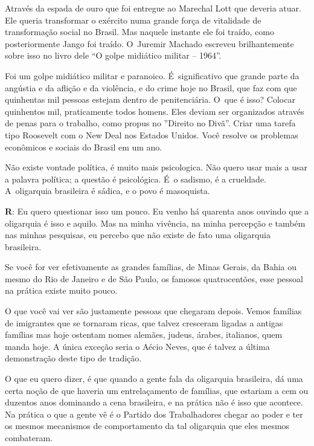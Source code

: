  

Através da espada de ouro que foi entregue ao Marechal Lott que deveria
atuar. Ele queria transformar o exército numa grande força de vitalidade
de transformação social no Brasil. Mas naquele instante ele foi traído,
como posteriormente Jango foi traído. O~Juremir Machado escreveu
brilhantemente sobre isso no livro dele ``O golpe midiático militar --
1964''.

 

Foi um golpe midiático militar e paranoico. É~significativo que grande
parte da angústia e da aflição e da violência, e do crime hoje no
Brasil, que faz com que quinhentas mil pessoas estejam dentro de
penitenciária. O~que é isso? Colocar quinhentos mil, praticamente todos
homens. Eles deviam ser organizados através de penas para o trabalho,
como propus no ''Direito no Divã''. Criar uma tarefa tipo Roosevelt com
o New Deal nos Estados Unidos. Você resolve os problemas econômicos e
sociais do Brasil em um ano.

 

Não existe vontade política, é muito mais psicologica. Não quero usar
mais a usar a palavra política; a questão é psicológica. É~o sadismo, é
a crueldade. A~oligarquia brasileira é sádica, e o povo é masoquista.

 

\textbf{R}: Eu quero questionar isso um pouco. Eu venho há quarenta anos
ouvindo que a oligarquia é isso e aquilo. Mas na minha vivência, na
minha percepção e também nas minhas pesquisas, eu percebo que não existe
de fato uma oligarquia brasileira.

 

Se você for ver efetivamente as grandes famílias, de Minas Gerais, da
Bahia ou mesmo do Rio de Janeiro e de São Paulo, os famosos
quatrocentões, esse pessoal na prática existe muito pouco.

 

O que você vai ver são justamente pessoas que chegaram depois. Vemos
famílias de imigrantes que se tornaram ricas, que talvez cresceram
ligadas a antigas famílias mas hoje ostentam nomes alemães, judeus,
árabes, italianos, quem manda hoje. A única exceção seria o Aécio Neves,
que é talvez a última demonstração deste tipo de tradição.

 

O que eu quero dizer, é que quando a gente fala da oligarquia
brasileira, dá uma certa noção de que haveria um entrelaçamento de
famílias, que estariam a cem ou duzentos anos dominando a cena
brasileira, e na prática não é isso que acontece. Na prática o que a
gente vê é o Partido dos Trabalhadores chegar ao poder e ter os mesmos
mecanismos de comportamento da tal oligarquia que eles mesmos
combateram.

